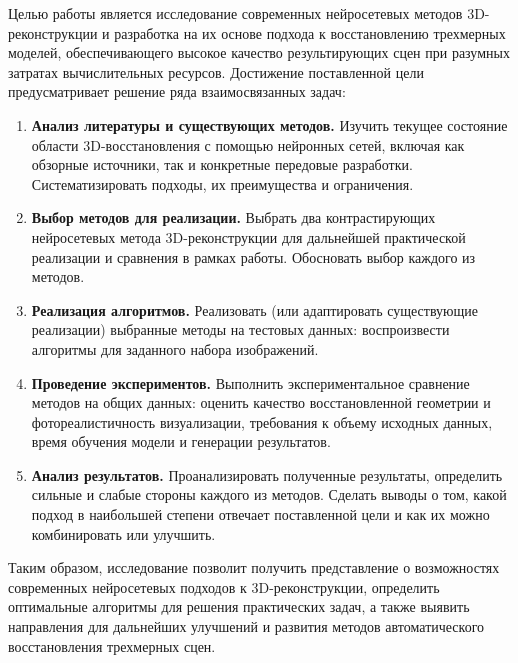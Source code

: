 Целью работы является исследование современных нейросетевых методов 3D-реконструкции
и разработка на их основе подхода к восстановлению трехмерных моделей,
обеспечивающего высокое качество результирующих сцен при разумных затратах
вычислительных ресурсов. Достижение поставленной цели предусматривает решение
ряда взаимосвязанных задач:

\begin{enumerate}

	\item \textbf{Анализ литературы и существующих методов.} Изучить текущее состояние
	области 3D-восстановления с помощью нейронных сетей, включая как обзорные
	источники, так и конкретные передовые разработки. Систематизировать подходы,
	их преимущества и ограничения.
	\item \textbf{Выбор методов для реализации.} Выбрать два контрастирующих
	нейросетевых метода 3D-реконструкции для дальнейшей практической реализации и
	сравнения в рамках работы. Обосновать выбор каждого из методов.
	\item \textbf{Реализация алгоритмов.} Реализовать (или адаптировать
	существующие реализации) выбранные методы на тестовых данных: воспроизвести
	алгоритмы для заданного набора изображений.
	\item \textbf{Проведение
	экспериментов.} Выполнить экспериментальное сравнение методов на общих данных:
	оценить качество восстановленной геометрии и фотореалистичность визуализации,
	требования к объему исходных данных, время обучения модели и генерации
	результатов.
	\item \textbf{Анализ результатов.} Проанализировать полученные
	результаты, определить сильные и слабые стороны каждого из методов. Сделать
	выводы о том, какой подход в наибольшей степени отвечает поставленной цели и
	как их можно комбинировать или улучшить.
\end{enumerate}

Таким образом, исследование позволит получить представление о
возможностях современных нейросетевых подходов к 3D-реконструкции, определить
оптимальные алгоритмы для решения практических задач, а также выявить
направления для дальнейших улучшений и развития методов автоматического
восстановления трехмерных сцен.
